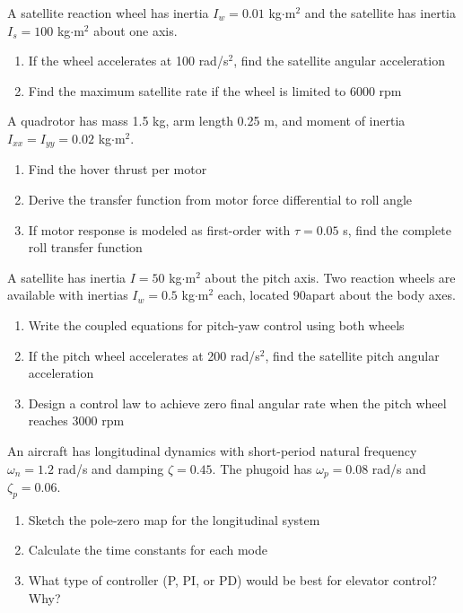 \begin{exercise}
A satellite reaction wheel has inertia $I_w = 0.01$ kg$\cdot$m$^2$ and the satellite has inertia $I_s = 100$ kg$\cdot$m$^2$ about one axis.
\begin{enumerate}[label=(\alph*)]
    \item If the wheel accelerates at 100 rad/s$^2$, find the satellite angular acceleration
    \item Find the maximum satellite rate if the wheel is limited to 6000 rpm
\end{enumerate}
\end{exercise}

\begin{exercise}
A quadrotor has mass 1.5 kg, arm length 0.25 m, and moment of inertia $I_{xx} = I_{yy} = 0.02$ kg$\cdot$m$^2$.
\begin{enumerate}[label=(\alph*)]
    \item Find the hover thrust per motor
    \item Derive the transfer function from motor force differential to roll angle
    \item If motor response is modeled as first-order with $\tau = 0.05$ s, find the complete roll transfer function
\end{enumerate}
\end{exercise}

\begin{exercise}
A satellite has inertia $I = 50$ kg$\cdot$m$^2$ about the pitch axis. Two reaction wheels are available with inertias $I_w = 0.5$ kg$\cdot$m$^2$ each, located 90\degree apart about the body axes.
\begin{enumerate}[label=(\alph*)]
    \item Write the coupled equations for pitch-yaw control using both wheels
    \item If the pitch wheel accelerates at 200 rad/s$^2$, find the satellite pitch angular acceleration
    \item Design a control law to achieve zero final angular rate when the pitch wheel reaches 3000 rpm
\end{enumerate}
\end{exercise}

\begin{exercise}
An aircraft has longitudinal dynamics with short-period natural frequency $\omega_n = 1.2$ rad/s and damping $\zeta = 0.45$. The phugoid has $\omega_p = 0.08$ rad/s and $\zeta_p = 0.06$.
\begin{enumerate}[label=(\alph*)]
    \item Sketch the pole-zero map for the longitudinal system
    \item Calculate the time constants for each mode
    \item What type of controller (P, PI, or PD) would be best for elevator control? Why?
\end{enumerate}
\end{exercise}

